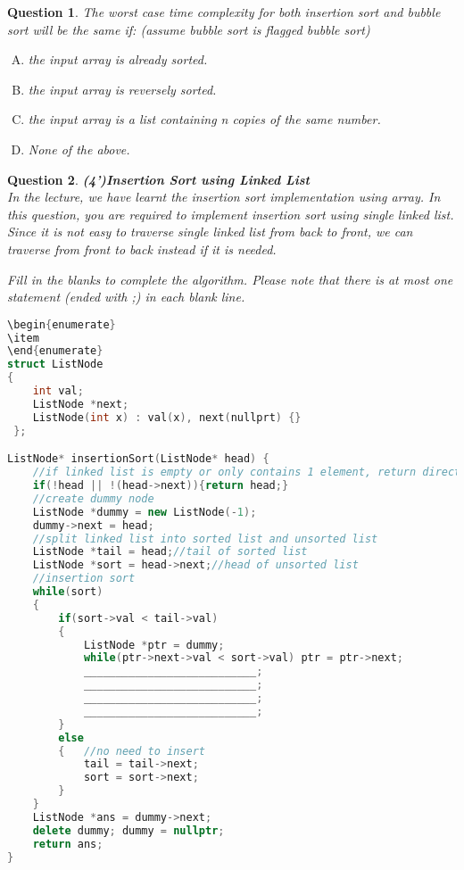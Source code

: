 \documentclass[10.5pt]{article}
\newtheorem{Q}{Question}
\begin{document}
	\begin{Q}
		The worst case time complexity for both insertion sort and bubble sort will be the same if: (assume bubble sort is flagged bubble sort)
		\begin{enumerate}[(A)]
			\item the input array is already sorted.
			\item the input array is reversely sorted.
			\item the input array is a list containing n copies of the same number.
			\item None of the above.
		\end{enumerate}
	\end{Q}
	\vspace{6cm}
	\begin{Q}\textbf{(4')Insertion Sort using Linked List}\\
		 In the lecture, we have learnt the insertion sort implementation using array. In this question, you are required to implement insertion sort using single linked list. Since it is not easy to traverse single linked list from back to front, we can traverse from front to back instead if it is needed.
		 
		 Fill in the blanks to complete the algorithm. Please note that there is at most one statement (ended with ;) in each blank line. 
		 
\hrulefill
\rm{
\begin{lstlisting}[language=C++]
\begin{enumerate}
\item 
\end{enumerate}
struct ListNode 
{
    int val;
 	ListNode *next;
 	ListNode(int x) : val(x), next(nullprt) {}
 };

ListNode* insertionSort(ListNode* head) {
    //if linked list is empty or only contains 1 element, return directly
    if(!head || !(head->next)){return head;}
    //create dummy node
    ListNode *dummy = new ListNode(-1);
    dummy->next = head;
    //split linked list into sorted list and unsorted list
    ListNode *tail = head;//tail of sorted list
    ListNode *sort = head->next;//head of unsorted list
    //insertion sort
    while(sort)
    {
        if(sort->val < tail->val)
        {
            ListNode *ptr = dummy;
            while(ptr->next->val < sort->val) ptr = ptr->next;
            ___________________________;
            ___________________________;
            ___________________________;
            ___________________________;
        }
        else
        {	//no need to insert
            tail = tail->next;
            sort = sort->next;
        }
    }
    ListNode *ans = dummy->next;
    delete dummy; dummy = nullptr;
    return ans;
}
\end{lstlisting}
}
		\vspace{1cm}
	\end{Q}
	
\end{document}
